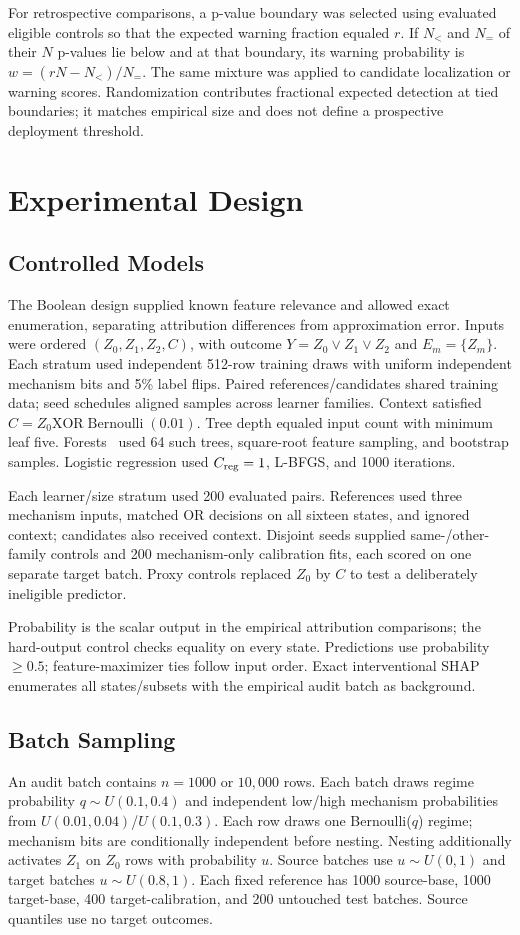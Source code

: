 \documentclass[conference]{IEEEtran}
\begin{document}
For retrospective comparisons, a p-value boundary was selected using evaluated eligible controls so that the expected warning fraction equaled $r$. If $N_{<}$ and $N_{=}$ of their $N$ p-values lie below and at that boundary, its warning probability is $w=(rN-N_{<})/N_{=}$. The same mixture was applied to candidate localization or warning scores. Randomization contributes fractional expected detection at tied boundaries; it matches empirical size and does not define a prospective deployment threshold.

\section{Experimental Design}
\label{sec:design}
\subsection{Controlled Models}
The Boolean design supplied known feature relevance and allowed exact enumeration, separating attribution differences from approximation error. Inputs were ordered $(Z_0,Z_1,Z_2,C)$, with outcome $Y=Z_0\lor Z_1\lor Z_2$ and $E_m=\{Z_m\}$. Each stratum used independent 512-row training draws with uniform independent mechanism bits and 5\% label flips. Paired references/candidates shared training data; seed schedules aligned samples across learner families. Context satisfied $C=Z_0\mathbin{\mathrm{XOR}}\operatorname{Bernoulli}(0.01)$. Tree depth equaled input count with minimum leaf five. Forests~\cite{breiman2001forests} used 64 such trees, square-root feature sampling, and bootstrap samples. Logistic regression used $C_{\rm reg}=1$, L-BFGS, and 1000 iterations.

Each learner/size stratum used 200 evaluated pairs. References used three mechanism inputs, matched OR decisions on all sixteen states, and ignored context; candidates also received context. Disjoint seeds supplied same-/other-family controls and 200 mechanism-only calibration fits, each scored on one separate target batch. Proxy controls replaced $Z_0$ by $C$ to test a deliberately ineligible predictor.

Probability is the scalar output in the empirical attribution comparisons; the hard-output control checks equality on every state. Predictions use probability $\geq0.5$; feature-maximizer ties follow input order. Exact interventional SHAP enumerates all states/subsets with the empirical audit batch as background.

\subsection{Batch Sampling}
An audit batch contains $n=1000$ or $10{,}000$ rows. Each batch draws regime probability $q\sim U(0.1,0.4)$ and independent low/high mechanism probabilities from $U(0.01,0.04)$/$U(0.1,0.3)$. Each row draws one Bernoulli($q$) regime; mechanism bits are conditionally independent before nesting. Nesting additionally activates $Z_1$ on $Z_0$ rows with probability $u$. Source batches use $u\sim U(0,1)$ and target batches $u\sim U(0.8,1)$. Each fixed reference has 1000 source-base, 1000 target-base, 400 target-calibration, and 200 untouched test batches. Source quantiles use no target outcomes.
\end{document}
